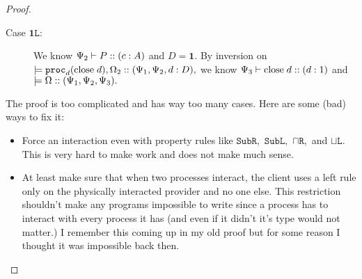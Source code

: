 \documentclass[11pt]{article}
\theoremstyle{plain}
\theoremstyle{definition}
\theoremstyle{remark}
\DeclarePairedDelimiter\parens{(}{)}             %
\newcommand\terminate{\mathbf{1}}
\newcommand\intersect{\mathbin{\sqcap}}
\newcommand\union{\mathbin{\sqcup}}
\newcommand\seq{\;;\;}
\newcommand\tclose[1]{\mathrm{close}\;#1}
\newcommand\trecv[3]{#1 \leftarrow \mathrm{recv} \; #2 \seq #3}
\newcommand\irb[1]{\texttt{#1}}
\newcommand\Right{\irb{R}}
\newcommand\Left{\irb{L}}
\newcommand{\emptyCtx}{\emptyset}
\newcommand{\ctx}{\Psi}
\newcommand{\config}{\Omega}
\newcommand\typeProc[3]{#1 :: \parens{#2 : #3}}
\newcommand\typeS[4]{#1 \vdash \typeProc{#2}{#3}{#4}}
\newcommand\stepArrow{\longrightarrow}
\newcommand\steps[2]{#1 \stepArrow #2}
\newcommand\proc[2]{\irb{proc}_{#1}\parens{#2}}
\newcommand\provides[2]{\models #1 :: \parens{#2}}
\begin{document}
\begin{proof}
\begin{description}
\begin{description}
      \item[Case $\terminate\Left:$] We know $\typeS{\ctx_2}{P}{c}{A}$ and $D = \terminate.$ By inversion on $\provides{\proc{d}{\tclose d}, \Omega_2}{\ctx_1, \ctx_2, d : D},$ we know $\typeS{\ctx_3}{\tclose{d}}{d}{1}$ and $\provides{\config}{\ctx_1, \ctx_2, \ctx_3}.$
    \end{description}
  \end{description}

  The proof is too complicated and has way too many cases. Here are some (bad) ways to fix it:
  \begin{itemize}
    \item Force an interaction even with property rules like $\irb{Sub}\Right,$ $\irb{Sub}\Left,$ $\intersect\Right,$ and $\union\Left.$ This is very hard to make work and does not make much sense.
    \item At least make sure that when two processes interact, the client uses a left rule only on the physically interacted provider and no one else. This restriction shouldn't make any programs impossible to write since a process has to interact with every process it has (and even if it didn't it's type would not matter.) I remember this coming up in my old  proof but for some reason I thought it was impossible back then.
  \end{itemize}
\end{proof}


  
\end{document}
